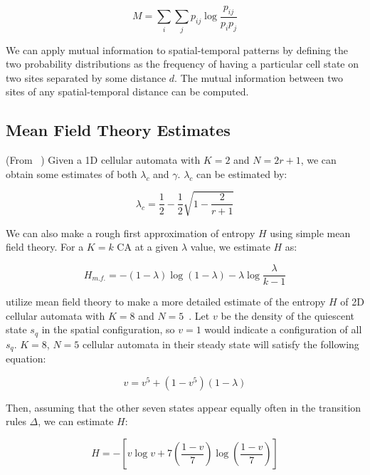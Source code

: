\documentclass[a4paper,11pt]{article}
\begin{document}
\begin{equation}
M = \sum_i \sum_j p_{ij} \log\frac{p_{ij}}{p_i p_j}
\end{equation}

We can apply mutual information to spatial-temporal patterns by defining the two probability distributions as the frequency of having a particular cell state on two sites separated by some distance $d$. The mutual information between two sites of any spatial-temporal distance can be computed.

\subsection{Mean Field Theory Estimates}
\label{appA:MFT}
(From \citeauthor{li90b}~\cite{li90b}) Given a 1D cellular automata with $K=2$ and $N = 2r+1$, we can obtain some estimates of both $\lambda_c$ and $\gamma$. $\lambda_c$ can be estimated by:

\begin{equation}
\lambda_c = \frac{1}{2} - \frac{1}{2}\sqrt{1 - \frac{2}{r+1}}
\end{equation}

We can also make a rough first approximation of entropy $H$ using simple mean field theory. For a $K=k$ CA at a given $\lambda$ value, we estimate $H$ as:

\begin{equation}
H_{m.f.} = - (1- \lambda) \log (1-\lambda) - \lambda \log \frac{\lambda}{k-1}
\end{equation}

\citeauthor{wo90} utilize mean field theory to make a more detailed estimate of the entropy $H$ of 2D cellular automata with $K=8$ and $N=5$~\cite{wo90}. Let $v$ be the density of the quiescent state $s_q$ in the spatial configuration, so $v=1$ would indicate a configuration of all $s_q$. $K=8$, $N=5$ cellular automata in their steady state will satisfy the following equation:

\begin{equation}
v = v^5 + (1 - v^5)(1- \lambda)
\end{equation}

\noindent Then, assuming that the other seven states appear equally often in the transition rules $\Delta$, we can estimate $H$:

\begin{equation}
H = -\left[ v \log v + 7\left(\frac{1-v}{7}\right)\log\left(\frac{1-v}{7}\right)\right]
\end{equation}
\end{document}
